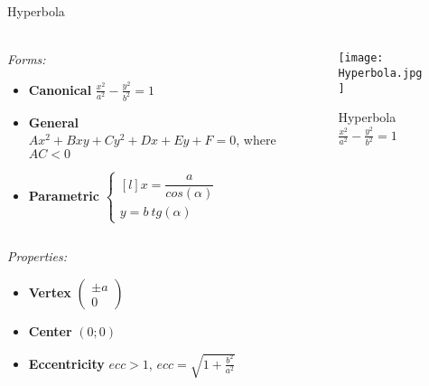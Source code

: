 \documentclass[aspectratio=169]{beamer}
\begin{document}
    \begin{frame}[t]{Hyperbola}
        \framesubtitle{}
            \scriptsize
            \vspace{-0.4cm}
        \begin{columns}[T,onlytextwidth]
            \begin{column}{0.59\textwidth}
                \textit{Forms:} \\
                \begin{itemize}
                    \item \textbf{Canonical} $\frac{x^2}{a^2}-\frac{y^2}{b^2}=1$
                    \item \textbf{General} $Ax^2+Bxy+Cy^2+Dx+Ey+F=0$, where $AC < 0$
                    \item \textbf{Parametric} $\left\{\begin{matrix*}[l] x = \dfrac{a}{cos(\alpha)}\\ y = b\ tg(\alpha) \end{matrix*}\right.$
                \end{itemize}
            \end{column}
            \begin{column}{0.39\textwidth}
                \vspace{-0.5cm}
                \begin{figure}[H]
                    \centering\texttt{[image: Hyperbola.jpg]}
                    \vspace{-0.4cm}
                    \caption*{\scriptsize Hyperbola $\frac{x^2}{a^2}-\frac{y^2}{b^2}=1$}
                    \label{fig:Hyperbola.jpg}
                \end{figure}
            \end{column}
        \end{columns}
        \vspace{-0.5cm}
        \textit{Properties:}
        \begin{multicols}{3}
            \begin{itemize}
                \item \textbf{Vertex} $\begin{pmatrix} \pm a\\0 \end{pmatrix}$
                \item \textbf{Center} $(0;0)$
                \item \textbf{Eccentricity} $ecc > 1$, $ecc = \sqrt{1 + \frac{b^2}{a^2}}$

\end{itemize}
\end{multicols}
\end{frame}
\end{document}

